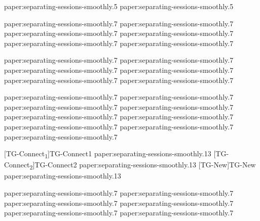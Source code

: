 \newcommand{\paperItmcolor}[1]{\ensuremath{{\color[HTML]{a40038}#1}}}
\newcommand{\paperItycolor}[1]{\ensuremath{{\color[HTML]{00007a}#1}}}
\def\paperItmcolorname{\paperItmcolor{\text{red}}}%
\def\paperItycolorname{\paperItycolor{\text{blue}}}%

%
{paper:separating-sessions-smoothly.5}
%
{paper:separating-sessions-smoothly.5}

%
{paper:separating-sessions-smoothly.7}
%
{paper:separating-sessions-smoothly.7}
%
{paper:separating-sessions-smoothly.7}
%
{paper:separating-sessions-smoothly.7}
%
{paper:separating-sessions-smoothly.7}
%
{paper:separating-sessions-smoothly.7}

%
{paper:separating-sessions-smoothly.7}
%
{paper:separating-sessions-smoothly.7}
%
{paper:separating-sessions-smoothly.7}
%
{paper:separating-sessions-smoothly.7}
%
{paper:separating-sessions-smoothly.7}
%
{paper:separating-sessions-smoothly.7}

%
{paper:separating-sessions-smoothly.7}
%
{paper:separating-sessions-smoothly.7}
%
{paper:separating-sessions-smoothly.7}
%
{paper:separating-sessions-smoothly.7}
%
{paper:separating-sessions-smoothly.7}
%
{paper:separating-sessions-smoothly.7}
%
{paper:separating-sessions-smoothly.7}
%
{paper:separating-sessions-smoothly.7}
%
{paper:separating-sessions-smoothly.7}

[TG-Connect\textsubscript{1}]{TG-Connect1}%
{paper:separating-sessions-smoothly.13}
[TG-Connect\textsubscript{2}]{TG-Connect2}%
{paper:separating-sessions-smoothly.13}
[TG-New]{TG-New}%
{paper:separating-sessions-smoothly.13}

%
{paper:separating-sessions-smoothly.7}
%
{paper:separating-sessions-smoothly.7}
%
{paper:separating-sessions-smoothly.7}
%
{paper:separating-sessions-smoothly.7}
%
{paper:separating-sessions-smoothly.7}
%
{paper:separating-sessions-smoothly.7}

